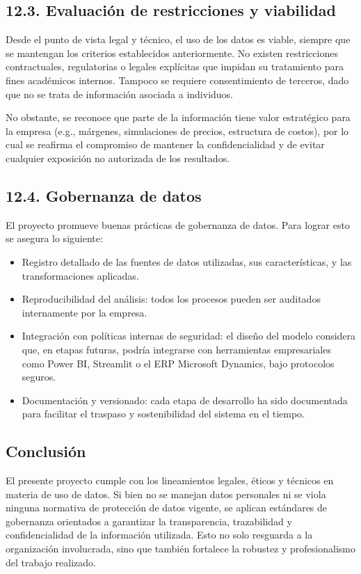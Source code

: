 \documentclass[
11pt, %
]{charter}
\begin{document}
\subsection*{12.3. Evaluación de restricciones y viabilidad}

Desde el punto de vista legal y técnico, el uso de los datos es viable, siempre que se mantengan los criterios establecidos anteriormente. No existen restricciones contractuales, regulatorias o legales explícitas que impidan su tratamiento para fines académicos internos. Tampoco se requiere consentimiento de terceros, dado que no se trata de información asociada a individuos.

No obstante, se reconoce que parte de la información tiene valor estratégico para la empresa (e.g., márgenes, simulaciones de precios, estructura de costos), por lo cual se reafirma el compromiso de mantener la confidencialidad y de evitar cualquier exposición no autorizada de los resultados.

\subsection*{12.4. Gobernanza de datos}

El proyecto promueve buenas prácticas de gobernanza de datos. Para lograr esto se asegura lo siguiente:

\begin{itemize}
  \item Registro detallado de las fuentes de datos utilizadas, sus características, y las transformaciones aplicadas.
  \item Reproducibilidad del análisis: todos los procesos pueden ser auditados internamente por la empresa.
  \item Integración con políticas internas de seguridad: el diseño del modelo considera que, en etapas futuras, podría integrarse con herramientas empresariales como Power BI, Streamlit o el ERP Microsoft Dynamics, bajo protocolos seguros.
  \item Documentación y versionado: cada etapa de desarrollo ha sido documentada para facilitar el traspaso y sostenibilidad del sistema en el tiempo.
\end{itemize}

\subsection*{Conclusión}

El presente proyecto cumple con los lineamientos legales, éticos y técnicos en materia de uso de datos. Si bien no se manejan datos personales ni se viola ninguna normativa de protección de datos vigente, se aplican estándares de gobernanza orientados a garantizar la transparencia, trazabilidad y confidencialidad de la información utilizada. Esto no solo resguarda a la organización involucrada, sino que también fortalece la robustez y profesionalismo del trabajo realizado.
\end{document}
